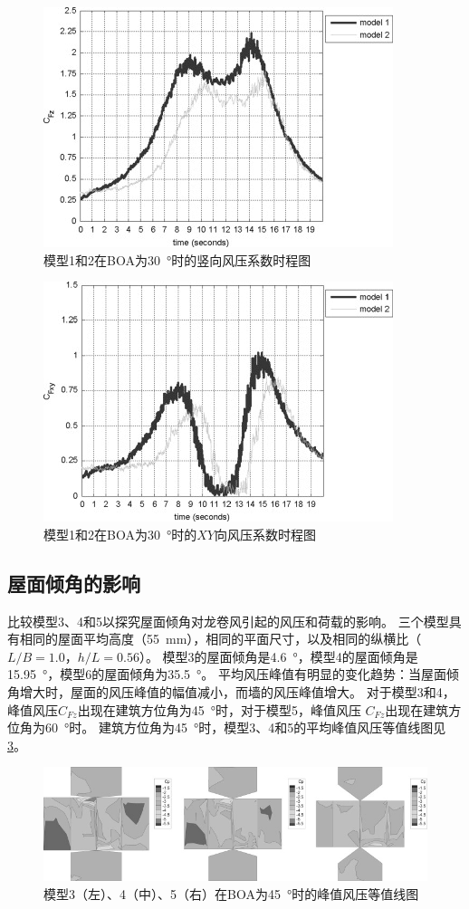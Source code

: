 \documentclass{ctexart}
\begin{document}
\begin{figure}
\centering
\includegraphics{./fig/5.jpg}
\caption{模型1和2在BOA为\SI{30}{\degree}时的竖向风压系数时程图}
\label{fig:Cfz}
\end{figure}

\begin{figure}
\centering
\includegraphics{./fig/6.jpg}
\caption{模型1和2在BOA为\SI{30}{\degree}时的$XY$向风压系数时程图}
\label{fig:Cfxy}
\end{figure}

\subsection{屋面倾角的影响}
比较模型3、4和5以探究屋面倾角对龙卷风引起的风压和荷载的影响。
三个模型具有相同的屋面平均高度（\SI{55}{mm}），相同的平面尺寸，以及相同的纵横比（$L/B=1.0$，$h/L=0.56$）。
模型3的屋面倾角是\SI{4.6}{\degree}，模型4的屋面倾角是\SI{15.95}{\degree}，模型6的屋面倾角为\SI{35.5}{\degree}。
平均风压峰值有明显的变化趋势：当屋面倾角增大时，屋面的风压峰值的幅值减小，而墙的风压峰值增大。
对于模型3和4，峰值风压$C_{Fz}$出现在建筑方位角为\SI{45}{\degree}时，对于模型5，峰值风压 $C_{Fz}$出现在建筑方位角为\SI{60}{\degree}时。
建筑方位角为\SI{45}{\degree}时，模型3、4和5的平均峰值风压等值线图见\ref{fig:p-pitch}。
\begin{figure}[h]
\centering
\includegraphics{./fig/7.jpg}
\caption{模型3（左）、4（中）、5（右）在BOA为\SI{45}{\degree}时的峰值风压等值线图}
\label{fig:p-pitch}
\end{figure}
\end{document}
